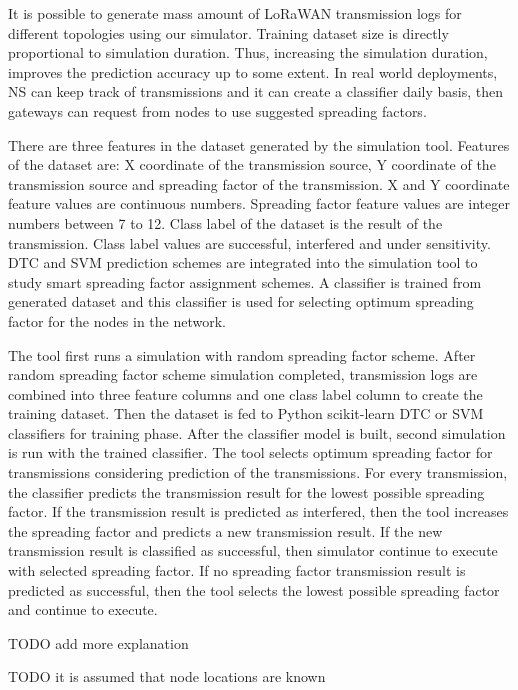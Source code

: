It is possible to generate mass amount of LoRaWAN transmission logs for different topologies using our simulator. Training dataset size is directly proportional to simulation duration. Thus, increasing the simulation duration, improves the prediction accuracy up to some extent. In real world deployments, NS can keep track of transmissions and it can create a classifier daily basis, then gateways can request from nodes to use suggested spreading factors.

There are three features in the dataset generated by the simulation tool. Features of the dataset are: X coordinate of the transmission source, Y coordinate of the transmission source and spreading factor of the transmission. X and Y coordinate feature values are continuous numbers. Spreading factor feature values are integer numbers between 7 to 12. Class label of the dataset is the result of the transmission. Class label values are successful, interfered and under sensitivity. DTC and SVM prediction schemes are integrated into the simulation tool to study smart spreading factor assignment schemes. A classifier is trained from generated dataset and this classifier is used for selecting optimum spreading factor for the nodes in the network.

The tool first runs a simulation with random spreading factor scheme. After random spreading factor scheme simulation completed, transmission logs are combined into three feature columns and one class label column to create the training dataset. Then the dataset is fed to Python scikit-learn DTC or SVM classifiers for training phase. After the classifier model is built, second simulation is run with the trained classifier. The tool selects optimum spreading factor for transmissions considering prediction of the transmissions. For every transmission, the classifier predicts the transmission result for the lowest possible spreading factor. If the transmission result is predicted as interfered, then the tool increases the spreading factor and predicts a new transmission result. If the new transmission result is classified as successful, then simulator continue to execute with selected spreading factor. If no spreading factor transmission result is predicted as successful, then the tool selects the lowest possible spreading factor and continue to execute.

TODO add more explanation

TODO it is assumed that node locations are known